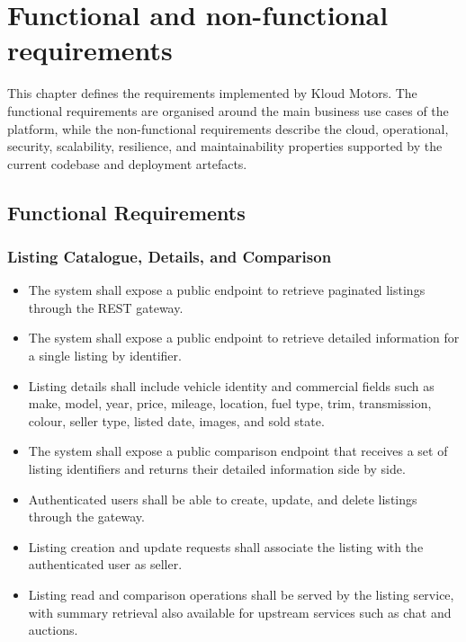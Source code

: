 \chapter{Functional and non-functional requirements} \label{cap:requirements}

This chapter defines the requirements implemented by Kloud Motors. The functional requirements are organised around the main business use cases of the platform, while the non-functional requirements describe the cloud, operational, security, scalability, resilience, and maintainability properties supported by the current codebase and deployment artefacts.

\section{Functional Requirements}

\subsection{Listing Catalogue, Details, and Comparison}

\begin{itemize}
    \item The system shall expose a public endpoint to retrieve paginated listings through the REST gateway.
    \item The system shall expose a public endpoint to retrieve detailed information for a single listing by identifier.
    \item Listing details shall include vehicle identity and commercial fields such as make, model, year, price, mileage, location, fuel type, trim, transmission, colour, seller type, listed date, images, and sold state.
    \item The system shall expose a public comparison endpoint that receives a set of listing identifiers and returns their detailed information side by side.
    \item Authenticated users shall be able to create, update, and delete listings through the gateway.
    \item Listing creation and update requests shall associate the listing with the authenticated user as seller.
    \item Listing read and comparison operations shall be served by the listing service, with summary retrieval also available for upstream services such as chat and auctions.
\end{itemize}

